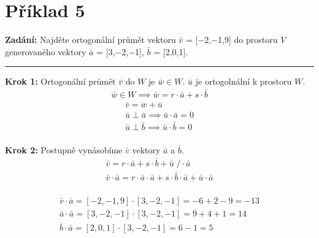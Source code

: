 \section{Příklad 5}

\textbf{Zadání:} Najděte ortogonální průmět vektoru $\bar{v}$ = [$\minus$2,$\minus$1,9] do prostoru $V$ generovaného vektory $\bar{a}$ = [3,$\minus$2,$\minus$1], $\bar{b}$ = [2,0,1].
\par\noindent\rule{\textwidth}{0.4pt}

\textbf{Krok 1:} Ortogonální průmět $\bar{v}$ do $W$ je $\bar{w} \in W$. $\bar{u}$ je ortogolnální k prostoru $W$. 
\begin{displaymath}
\begin{matrix}
\bar{w} \in W \implies \bar{w} = r\cdot\bar{a}+s\cdot\bar{b}
\end{matrix}
\end{displaymath}
\begin{displaymath}
\begin{matrix}
\bar{v} = \bar{w} + \bar{u} \\
\bar{u} \perp \bar{a} \implies \bar{u} \cdot \bar{a} = 0\\
\bar{u} \perp \bar{b} \implies \bar{u} \cdot \bar{b} = 0\\
\end{matrix}
\end{displaymath}

\textbf{Krok 2:} Postupně vynásobíme $\bar{v}$ vektory $\bar{a}$ a $\bar{b}$.
\begin{displaymath}
\begin{matrix}
\bar{v} = r\cdot\bar{a}+s\cdot\bar{b} + \bar{u} \; / \cdot \bar{a}\\
\bar{v}\cdot\bar{a} = r\cdot\bar{a}\cdot\bar{a} + s\cdot\bar{b}\cdot\bar{a} + \bar{u}\cdot\bar{a}\\
\end{matrix}
\end{displaymath}

\begin{displaymath}
\begin{matrix}
\bar{v}\cdot\bar{a} = [\minus2,\minus1,9]\cdot[3,\minus2,\minus1]=\minus6+2-9=\minus13\\
\bar{a}\cdot\bar{a} = [3,\minus2,\minus1]\cdot[3,\minus2,\minus1]=9+4+1=14\\
\bar{b}\cdot\bar{a} = [2,0,1]\cdot[3,\minus2,\minus1]=6\minus1=5\\
\end{matrix}
\end{displaymath}


